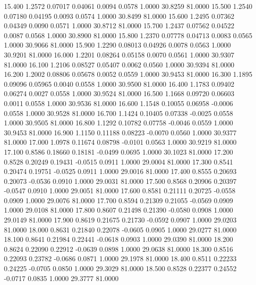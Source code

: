   15.400   1.2572   0.07017   0.04061   0.0094   0.0578   1.0000  30.8259  81.0000
  15.500   1.2540   0.07180   0.04195   0.0093   0.0574   1.0000  30.8499  81.0000
  15.600   1.2495   0.07362   0.04349   0.0090   0.0571   1.0000  30.8712  81.0000
  15.700   1.2437   0.07562   0.04522   0.0087   0.0568   1.0000  30.8900  81.0000
  15.800   1.2370   0.07778   0.04713   0.0083   0.0565   1.0000  30.9066  81.0000
  15.900   1.2290   0.08013   0.04926   0.0078   0.0563   1.0000  30.9201  81.0000
  16.000   1.2201   0.08264   0.05158   0.0070   0.0561   1.0000  30.9307  81.0000
  16.100   1.2106   0.08527   0.05407   0.0062   0.0560   1.0000  30.9394  81.0000
  16.200   1.2002   0.08806   0.05678   0.0052   0.0559   1.0000  30.9453  81.0000
  16.300   1.1895   0.09096   0.05965   0.0040   0.0558   1.0000  30.9500  81.0000
  16.400   1.1783   0.09402   0.06274   0.0027   0.0558   1.0000  30.9524  81.0000
  16.500   1.1668   0.09720   0.06603   0.0011   0.0558   1.0000  30.9536  81.0000
  16.600   1.1548   0.10055   0.06958  -0.0006   0.0558   1.0000  30.9528  81.0000
  16.700   1.1424   0.10405   0.07338  -0.0025   0.0558   1.0000  30.9505  81.0000
  16.800   1.1292   0.10782   0.07758  -0.0046   0.0559   1.0000  30.9453  81.0000
  16.900   1.1150   0.11188   0.08223  -0.0070   0.0560   1.0000  30.9377  81.0000
  17.000   1.0978   0.11674   0.08798  -0.0101   0.0563   1.0000  30.9219  81.0000
  17.100   0.8586   0.18660   0.18181  -0.0499   0.0695   1.0000  30.1023  81.0000
  17.200   0.8528   0.20249   0.19431  -0.0515   0.0911   1.0000  29.0004  81.0000
  17.300   0.8541   0.20474   0.19751  -0.0525   0.0911   1.0000  29.0016  81.0000
  17.400   0.8555   0.20693   0.20073  -0.0536   0.0910   1.0000  29.0031  81.0000
  17.500   0.8568   0.20906   0.20397  -0.0547   0.0910   1.0000  29.0051  81.0000
  17.600   0.8581   0.21111   0.20725  -0.0558   0.0909   1.0000  29.0076  81.0000
  17.700   0.8594   0.21309   0.21055  -0.0569   0.0909   1.0000  29.0108  81.0000
  17.800   0.8607   0.21498   0.21390  -0.0580   0.0908   1.0000  29.0149  81.0000
  17.900   0.8619   0.21675   0.21730  -0.0592   0.0907   1.0000  29.0203  81.0000
  18.000   0.8631   0.21840   0.22078  -0.0605   0.0905   1.0000  29.0277  81.0000
  18.100   0.8641   0.21984   0.22441  -0.0618   0.0903   1.0000  29.0390  81.0000
  18.200   0.8624   0.22090   0.22912  -0.0639   0.0898   1.0000  29.0638  81.0000
  18.300   0.8516   0.22093   0.23782  -0.0686   0.0871   1.0000  29.1978  81.0000
  18.400   0.8511   0.22233   0.24225  -0.0705   0.0850   1.0000  29.3029  81.0000
  18.500   0.8528   0.22377   0.24552  -0.0717   0.0835   1.0000  29.3777  81.0000
